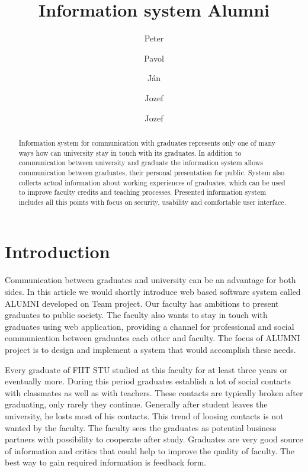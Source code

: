 \documentclass{iitsrc}[2006/14/02]
\title{Information system Alumni}
\author{Peter}{C\'ich}
\author{Pavol}{F\'abik}
\author{J\'an}{Garaj}
\author{Jozef}{Hergott}
\author{Jozef}{Hopko}
\begin{document}
\begin{abstract}
Information system for communication with graduates represents only one of many ways how can university stay in touch with its graduates. In addition to communication between university and graduate the information system allows communication between graduates, their personal presentation for public. System also collects actual information about working experiences of graduates, which can be used to improve faculty credits and teaching processes. Presented information system includes all this points with focus on security, usability and comfortable user interface.
\end{abstract}


\section{Introduction}

Communication between graduates and university can be an advantage for both sides. In this article we would shortly introduce web based software system called ALUMNI developed on Team project. Our faculty has ambitions to present graduates to public society. The faculty also wants to stay in touch with graduates using web application, providing a channel for professional and social communication between graduates each other and faculty. The focus of ALUMNI project is to design and implement a system that would accomplish these needs. 

Every graduate of FIIT STU studied at this faculty for at least three years or eventually more. During this period graduates establish a lot of social contacts with classmates as well as with teachers. These contacts are typically broken after graduating, only rarely they continue. Generally after student leaves the university, he losts most of his contacts. This trend of loosing contacts is not wanted by the faculty. The faculty sees the graduates as potential business partners with possibility to cooperate after study. Graduates are very good source of information and critics that could help to improve the quality of faculty. The best way to gain required information is feedback form.

\end{document}
